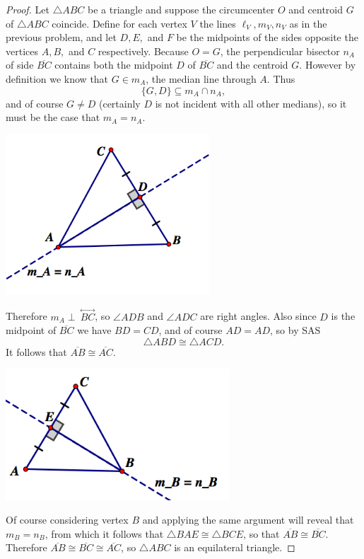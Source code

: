\documentclass[12pt]{article}
\renewcommand{\line}[1]{\stackrel{\longleftrightarrow}{#1}}
\newcommand{\seg}[1]{\overline{#1}}
\begin{document}
\begin{enumerate}
\begin{proof} Let $\triangle ABC$ be a triangle and suppose the circumcenter $O$ and centroid $G$ of $\triangle ABC$ coincide. Define for each vertex $V$ the lines $\ell_V, m_V, n_V$ as in the previous problem, and let $D,E,$ and $F$ be the midpoints of the sides opposite the vertices $A,B,$ and $C$ respectively. Because $O=G$, the perpendicular bisector $n_A$ of side $\seg{BC}$ contains both the midpoint $D$ of $\seg{BC}$ and the centroid $G$. However by definition we know that $G\in m_A$, the median line through $A$. Thus
$$\{G,D\} \subseteq m_A \cap n_A,$$ and of course $G\ne D$ (certainly $D$ is not incident with all other medians), so it must be the case that $m_A=n_A$.
\begin{center}\includegraphics[width=3in]{7a.png}\end{center}
Therefore $m_A \perp \ \line{BC}$, so $\angle ADB$ and $\angle ADC$ are right angles. Also since $D$ is the midpoint of $\seg{BC}$ we have $BD=CD$, and of course $AD=AD$, so by SAS
$$\triangle ABD \cong \triangle ACD.$$
It follows that $\seg{AB}\cong\seg{AC}.$
\begin{center}\includegraphics[width=3.3in]{7b.png}\end{center}
Of course considering vertex $B$ and applying the same argument will reveal that $m_B=n_B$, from which it follows that $\triangle BAE \cong \triangle BCE$, so that $\seg{AB}\cong\seg{BC}$. Therefore $\seg{AB}\cong \seg{BC}\cong\seg{AC}$, so $\triangle ABC$ is an equilateral triangle.\end{proof}


\end{enumerate}
\end{document}
